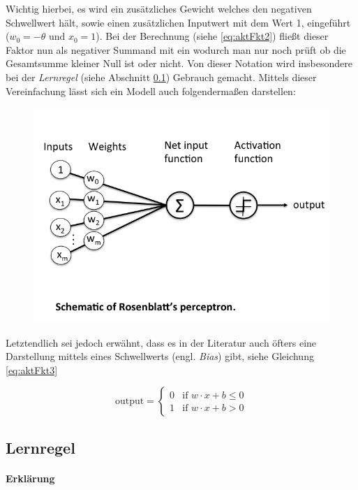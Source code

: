 \label{w0Erklaerung}
Wichtig hierbei, es wird ein zusätzliches Gewicht welches den negativen Schwellwert hält, sowie einen zusätzlichen Inputwert mit dem Wert 1, eingeführt ($w_0 = -\theta  \text{ und } x_0=1$). Bei der Berechnung (siehe \autoref{eq:aktFkt2}) fließt dieser Faktor nun als negativer Summand mit ein wodurch man nur noch prüft ob die Gesamtsumme kleiner Null ist oder nicht. Von dieser Notation wird insbesondere bei der \emph{Lernregel} (siehe Abschnitt \ref{ss:lernregel}) Gebrauch gemacht. Mittels dieser Vereinfachung lässt sich ein Modell auch folgendermaßen darstellen:

\begin{figure}[!htb]
	\centering
	\includegraphics[width=.6\linewidth]{img/perceptron_schematisch}
	\label{fig:perc_modelansicht}
\end{figure}

\FloatBarrier

Letztendlich sei jedoch erwähnt, dass es in der Literatur auch öfters eine Darstellung mittels eines Schwellwerts (engl. \emph{Bias}) gibt, siehe Gleichung \autoref{eq:aktFkt3} \cite{dlnielsen}

\begin{equation} \label{eq:aktFkt3}
\mbox{output} =\begin{cases}
	0 & \mbox{if } w\cdot x + b \leq 0 \\
    1 & \mbox{if } w\cdot x + b > 0
  \end{cases}
\end{equation}



\subsection{Lernregel} \label{ss:lernregel}

\paragraph{Erklärung}

